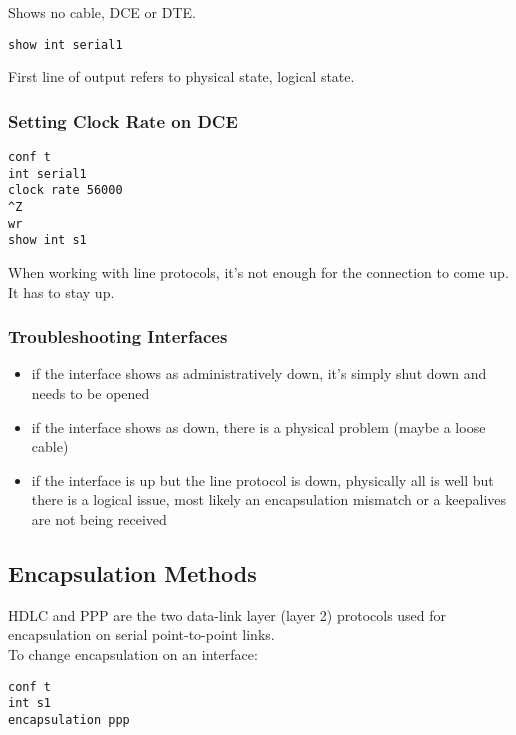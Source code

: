 Shows no cable, DCE or DTE.\\

\begin{verbatim}
show int serial1
\end{verbatim}

First line of output refers to physical state, logical state.

\subsubsection{Setting Clock Rate on DCE}

\begin{verbatim}
conf t
int serial1
clock rate 56000
^Z
wr
show int s1
\end{verbatim}

When working with line protocols, it's not enough for the connection to
come up. It has to stay up.\\

\subsubsection{Troubleshooting Interfaces}

\begin{itemize}

\item if the interface shows as administratively down, it's simply shut
down and needs to be opened

\item if the interface shows as down, there is a physical problem (maybe
a loose cable)

\item if the interface is up but the line protocol is down, physically
all is well but there is a logical issue, most likely an encapsulation
mismatch or a keepalives are not being received

\end{itemize}

\subsection{Encapsulation Methods}

HDLC and PPP are the two data-link layer (layer 2) protocols used for
encapsulation on serial point-to-point links.\\

To change encapsulation on an interface:

\begin{verbatim}
conf t
int s1
encapsulation ppp
\end{verbatim}

